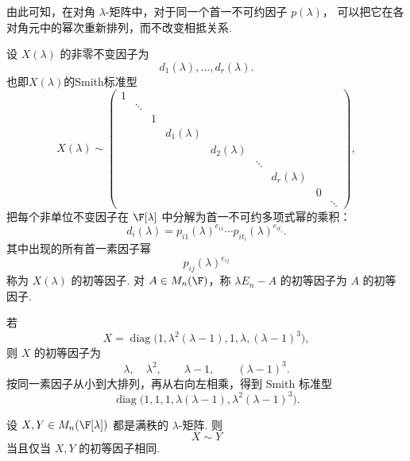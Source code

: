 由此可知，在对角 $\lambda$-矩阵中，对于同一个首一不可约因子 $p(\lambda)$，
可以把它在各对角元中的幂次重新排列，而不改变相抵关系.




\begin{definition}\label{p1:concept:c5-l2454}
	设 $X(\lambda)$ 的非零不变因子为
	\[
	d_1(\lambda),\ldots,d_r(\lambda).
	\]
	也即$X(\lambda)$的Smith标准型
	\[
	X(\lambda)\sim
	\begin{pmatrix}
		1\\
		&\ddots\\
		&&1\\
		&&&d_1(\lambda) \\
		&&&& d_2(\lambda) \\
		&&&&& \ddots \\
		&&&&&& d_r(\lambda) \\
		&&&&&&& 0 \\
		&&&&&&&& \ddots
	\end{pmatrix},
	\]
	把每个非单位不变因子在 $\F[\lambda]$ 中分解为首一不可约多项式幂的乘积：
	\[
	d_i(\lambda)=p_{i1}(\lambda)^{e_{i1}}\cdots p_{it_i}(\lambda)^{e_{it_i}}.
	\]
	其中出现的所有首一素因子幂
	\[
	p_{ij}(\lambda)^{e_{ij}}
	\]
	称为 $X(\lambda)$ 的初等因子. 对 $A\in M_n(\F)$，称 $\lambda E_n-A$ 的初等因子为 $A$ 的初等因子.
\end{definition}
\begin{example}
	若
	\[
	X=\operatorname{diag}\bigl(1,\lambda^2(\lambda-1),1,\lambda,(\lambda-1)^3\bigr),
	\]
	则 $X$ 的初等因子为
	\[
	\lambda,\quad \lambda^2,
	\qquad
	\lambda-1,
	\qquad
	(\lambda-1)^3.
	\]
	按同一素因子从小到大排列，再从右向左相乘，得到 Smith 标准型
	\[
	\operatorname{diag}\bigl(1,1,1,\lambda(\lambda-1),\lambda^2(\lambda-1)^3\bigr).
	\]
\end{example}


\begin{lemma}
	设 $X,Y\in M_n(\F[\lambda])$ 都是满秩的 $\lambda$-矩阵. 则
	\[
	X\sim Y
	\]
	当且仅当 $X,Y$ 的初等因子相同.
\end{lemma}

